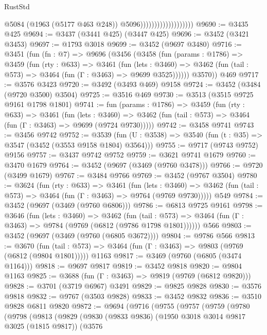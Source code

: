 \begin{lexlean}{RustStd}
\begin{coremodule}
                                          @5084
                                          (@1963 (@5177 @463 @248))
                                          @5096)))))))))))))))))))
@9690 := @3435 @425
@9694 := @3437 (@3441 @425) (@3447 @425)
@9696 := @3452 (@3421 @3453)
@9697 := @1793 @3018
@9699 := @3452 (@9697 @3480)
@9716 := @3451
    (fun (fn : @7) =>
    @9696
      (@3456
        (@3458
          (fun (params : @1786) =>
          @3459
            (fun (rty : @633) =>
            @3461
              (fun (lets : @3460) =>
              @3462 (fun (tail : @573) => @3464 (fun (Γ : @3463) => @9699 @3525))))))
        @3570))
    @469
@9717 := @3576 @3423
@9720 := @3492 (@3493 @469) @9158
@9724 := @3452 (@3484 (@9720 @3500) @3504)
@9725 := @3516 @469
@9730 := @3513 (@3515 @9725 @9161 @1798 @1801)
@9741 := fun (params : @1786) =>
  @3459
    (fun (rty : @633) =>
    @3461
      (fun (lets : @3460) =>
      @3462 (fun (tail : @573) => @3464 (fun (Γ : @3463) => @9699 (@9724 @9730)))))
@9742 := @3458 @9741
@9743 := @3456 @9742
@9752 := @3539 (fun (U : @3538) => @3540 (fun (t : @35) => @3547 (@3452 (@3553 @9158 @1804) @3564)))
@9755 := @9717 (@9743 @9752) @9156
@9757 := @3437 @9742 @9752
@9759 := @3621 @9741 @1679
@9760 := @3470 @1679
@9764 := @3452 (@9697 (@3469 (@9760 @3478)))
@9766 := @9720 (@3499 @1679)
@9767 := @3484 @9766
@9769 := @3452 (@9767 @3504)
@9780 := @3624
    (fun (rty : @633) =>
    @3461
      (fun (lets : @3460) =>
      @3462 (fun (tail : @573) => @3464 (fun (Γ : @3463) => @9764 (@9769 @9730)))))
    @549
@9784 := @3452 (@9697 (@3469 (@9760 @6806)))
@9786 := @6813 @9725 @9161
@9798 := @3646
    (fun (lets : @3460) =>
    @3462
      (fun (tail : @573) => @3464 (fun (Γ : @3463) => @9784 (@9769 (@6812 (@9786 @1798 @1801))))))
    @566
@9803 := @3452 (@9697 (@3469 (@9760 (@6805 @3672))))
@9804 := @9786 @566
@9813 := @3670
    (fun (tail : @573) => @3464 (fun (Γ : @3463) => @9803 (@9769 (@6812 (@9804 @1801)))))
    @1163
@9817 := @3469 (@9760 (@6805 (@3474 @1164)))
@9818 := @9697 @9817
@9819 := @3452 @9818
@9820 := @9804 @1163
@9825 := @3688 (fun (Γ : @3463) => @9819 (@9769 (@6812 @9820)))
@9828 := @3701 (@3719 @6967) @3491
@9829 := @9825 @9828
@9830 := @3576 @9818
@9832 := @9767 (@3503 @9828)
@9833 := @3452 @9832
@9836 := @3510 @9828 @6811 @9820
@9872 := @9694
    (@9716
      (@9755
        (@9757
          (@9759
            (@9780
              (@9798
                (@9813
                  (@9829
                    (@9830
                      (@9833 @9836)
                      (@1950 @3018 @3014 @9817 @3025 (@1815 @9817))
                      (@3576

\end{coremodule}
\end{lexlean}
